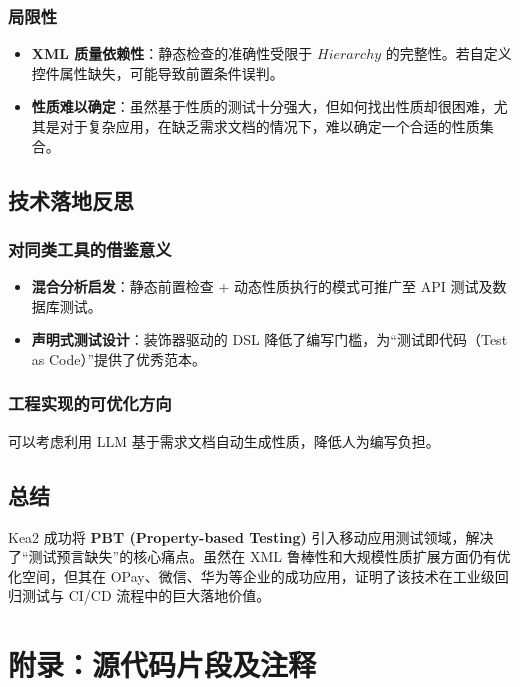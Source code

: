 \documentclass[a4paper, zihao=-4]{ctexart}
\begin{document}
\subsubsection{局限性}

\begin{itemize}
    \item \textbf{XML 质量依赖性}：静态检查的准确性受限于 $Hierarchy$ 的完整性。若自定义控件属性缺失，可能导致前置条件误判。
    \item \textbf{性质难以确定}：虽然基于性质的测试十分强大，但如何找出性质却很困难，尤其是对于复杂应用，在缺乏需求文档的情况下，难以确定一个合适的性质集合。
\end{itemize}

\subsection{技术落地反思}

\subsubsection{对同类工具的借鉴意义}
\begin{itemize}
    \item \textbf{混合分析启发}：静态前置检查 + 动态性质执行的模式可推广至 API 测试及数据库测试。
    \item \textbf{声明式测试设计}：装饰器驱动的 DSL 降低了编写门槛，为“测试即代码（Test as Code）”提供了优秀范本。
\end{itemize}

\subsubsection{工程实现的可优化方向}

可以考虑利用 LLM 基于需求文档自动生成性质，降低人为编写负担。

\subsection{总结}
Kea2 成功将 \textbf{PBT (Property-based Testing)} 引入移动应用测试领域，解决了“测试预言缺失”的核心痛点。虽然在 XML 鲁棒性和大规模性质扩展方面仍有优化空间，但其在 OPay、微信、华为等企业的成功应用，证明了该技术在工业级回归测试与 CI/CD 流程中的巨大落地价值。

\newpage
\appendix
\section{附录：源代码片段及注释}
\end{document}
